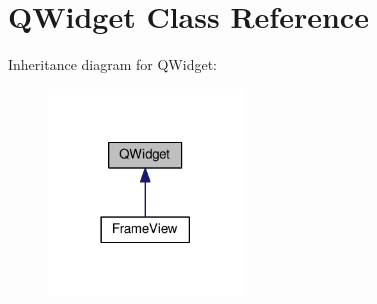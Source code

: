 \hypertarget{classGUI_1_1QWidget}{}\section{Q\+Widget Class Reference}
\label{classGUI_1_1QWidget}


Inheritance diagram for Q\+Widget\+:
\nopagebreak
\begin{figure}[H]
\begin{center}
\leavevmode
\includegraphics[width=146pt]{classGUI_1_1QWidget__inherit__graph}
\end{center}
\end{figure}
